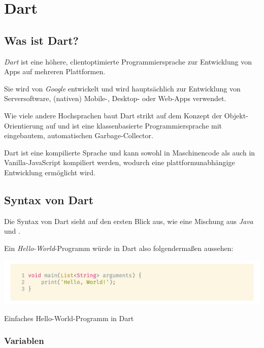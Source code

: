 \section{Dart}
\label{dart}

\subsection{Was ist Dart?}

\textit{Dart} ist eine höhere, clientoptimierte Programmiersprache zur Entwicklung von Apps auf mehreren Plattformen.

Sie wird von \textit{Google} entwickelt und wird hauptsächlich zur Entwicklung von Serversoftware, (nativen) Mobile-, Desktop- oder Web-Apps verwendet.

Wie viele andere Hochsprachen baut Dart strikt auf dem Konzept der Objekt-Orientierung auf und ist eine klassenbasierte Programmiersprache mit eingebautem, automatischen
Garbage-Collector.

Dart ist eine kompilierte Sprache und kann sowohl in Maschinencode als auch in Vanilla-JavaScript kompiliert werden, wodurch eine plattformunabhängige Entwicklung ermöglicht 
wird.~\cite{dartoverview2021}

\subsection{Syntax von Dart}

Die Syntax von Dart sieht auf den ersten Blick aus, wie eine Mischung aus \textit{Java} und .

\newpage

Ein \textit{Hello-World}-Programm würde in Dart also folgendermaßen aussehen:

\begin{code}[H]
    \centering
    \includegraphics[width=1\textwidth]{images/Dart/theory/dartHelloWorld.png}
    \vspace{-25pt}
    \caption{Einfaches Hello-World-Programm in Dart}
\end{code}

\subsubsection{Variablen}

